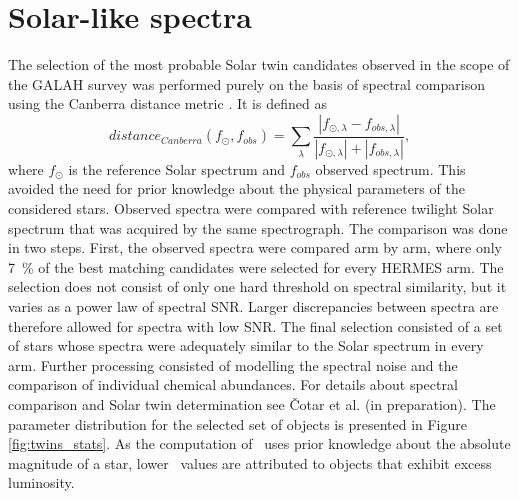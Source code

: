 \section{Solar-like spectra}
\label{sec:solar_twins_sel}
The selection of the most probable Solar twin candidates observed in the scope of the GALAH survey was performed purely on the basis of spectral comparison using the Canberra distance metric \citep{Lance1967MixedDataCP}. It is defined as
\begin{equation}
	\label{equ:equ_canberra}
	distance_{Canberra}(f_{\odot}, f_{obs}) = \sum_{\lambda}^{\ } \frac{|f_{\odot,\lambda} - f_{obs,\lambda}|}{|f_{\odot,\lambda}| + |f_{obs,\lambda}|},
\end{equation}
where $f_{\odot}$ is the reference Solar spectrum and $f_{obs}$ observed spectrum. This avoided the need for prior knowledge about the physical parameters of the considered stars. Observed spectra were compared with reference twilight Solar spectrum that was acquired by the same spectrograph. The comparison was done in two steps. First, the observed spectra were compared arm by arm, where only 7~\% of the best matching candidates were selected for every HERMES arm. The selection does not consist of only one hard threshold on spectral similarity, but it varies as a power law of spectral SNR. Larger discrepancies between spectra are therefore allowed for spectra with low SNR. The final selection consisted of a set of stars whose spectra were adequately similar to the Solar spectrum in every arm. Further processing consisted of modelling the spectral noise and the comparison of individual chemical abundances. For details about spectral comparison and Solar twin determination see \v{C}otar et al. (in preparation). The parameter distribution for the selected set of objects is presented in Figure \ref{fig:twins_stats}. As the computation of \Logg\ uses prior knowledge about the absolute magnitude of a star, lower \Logg\ values are attributed to objects that exhibit excess luminosity. 

